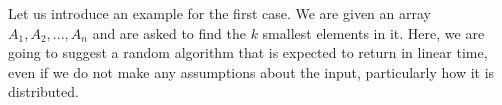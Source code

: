 Let us introduce an example for the first case. We are given an array $A_{1}, A_{2}, ..., A_{n}$ and are asked to find the $k$ smallest elements in it. Here, we are going to suggest a random algorithm that is expected to return in linear time, even if we do not make any assumptions about the input, particularly how it is distributed.



%

